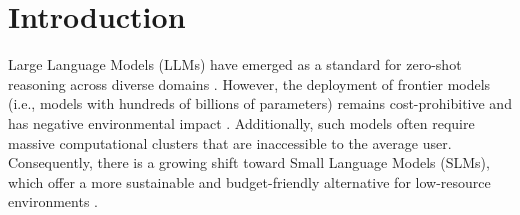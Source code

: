 \documentclass[
]{ceurart}
\begin{document}



\section{Introduction}
Large Language Models (LLMs) have emerged as a standard for zero-shot reasoning across diverse domains \cite{llms1,llm22,llms3}. However, the deployment of frontier models (i.e., models with hundreds of billions of parameters) remains cost-prohibitive and has negative environmental impact \cite{environment,environment2}. Additionally, such models often require massive computational clusters that are inaccessible to the average user. Consequently, there is a growing shift toward Small Language Models (SLMs), which offer a more sustainable and budget-friendly alternative for low-resource environments \cite{slms1,slms2,slms3,slms4}.
\end{document}
